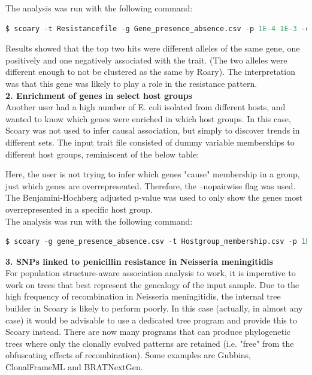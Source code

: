 \documentclass{article}
\begin{document}
    The analysis was run with the following command: \\
    \begin{lstlisting}[language=python, basicstyle=\small]
      $ scoary -t Resistancefile -g Gene_presence_absence.csv -p 1E-4 1E-3 -c EPW P -e 10000 -w -r OnlyAbscessusIsolates.csv --collapse -n raxmltree.nwk
    \end{lstlisting}

    Results showed that the top two hits were different alleles of the same gene, one positively and one negatively associated with the trait. (The two alleles were different enough to not be clustered as the same by Roary). The interpretation was that this gene was likely to play a role in the resistance pattern. \\

    \textbf{2. Enrichment of genes in select host groups} \\

    Another user had a high number of E. coli isolated from different hosts, and wanted to know which genes were enriched in which host groups. In this case, Scoary was not used to infer causal association, but simply to discover trends in different sets. The input trait file consisted of dummy variable memberships to different host groups, reminiscent of the below table: \\
    

    Here, the user is not trying to infer which genes "cause" membership in a group, just which genes are overrepresented. Therefore, the --no\textunderscore pairwise flag was used. The Benjamini-Hochberg adjusted p-value was used to only show the genes most overrepresented in a specific host group. \\

    The analysis was run with the following command: \\
    \begin{lstlisting}[language=python, basicstyle=\small]
      $ scoary -g gene_presence_absence.csv -t Hostgroup_membership.csv -p 1E-5 -c BH --no_pairwise
    \end{lstlisting}

    \textbf{3. SNPs linked to penicillin resistance in Neisseria meningitidis} \\

    For population structure-aware association analysis to work, it is imperative to work on trees that best represent the genealogy of the input sample. Due to the high frequency of recombination in Neisseria meningitidis, the internal tree builder in Scoary is likely to perform poorly. In this case (actually, in almost any case) it would be advisable to use a dedicated tree program and provide this to Scoary instead. There are now many programs that can produce phylogenetic trees where only the clonally evolved patterns are retained (i.e. "free" from the obfuscating effects of recombination). Some examples are Gubbins, ClonalFrameML and BRATNextGen. \\
    
\end{document}
